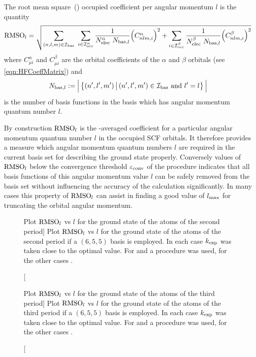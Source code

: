 \defineabbr{RMS}{RMS\xspace}{root mean square}
\begin{defn}
	\label{defn:RMSOl}
	The root mean square~(\RMS) occupied coefficient per angular momentum $l$
	is the quantity
	\begin{equation}
	\text{RMSO}_l =
		\sqrt{
		\sum_{(n,l,m) \in \mathcal{I}_\text{bas}} \
		\sum_{i \in \mathcal{I}_\text{occ}^\alpha} \frac{1}{N_\text{elec}^\alpha \ N_{\text{bas}, l}}
			\Big(C^\alpha_{nlm, i} \Big)^2
			+ \sum_{i \in \mathcal{I}_\text{occ}^\beta} \frac{1}{N_\text{elec}^\beta \ N_{\text{bas}, l}}
			\Big( C^\beta_{nlm, i} \Big)^2
		}
		\label{eqn:DefRMSOl}
	\end{equation}
	where $C^\alpha_{\mu i}$ and $C^\beta_{\mu i}$
	are the orbital coefficients of the $\alpha$ and $\beta$ orbitals
	(see \eqref{eqn:HFCoeffMatrix})
	and
	\[
		N_{\text{bas}, l} := \Big| \left\{ (n',l',m') \, \big|\, (n',l',m') \in \mathcal{I}_\text{bas}
			\ \text{and} \ l' = l \right\} \Big|
	\]
	is the number of basis functions in the \CS basis which has angular momentum
	quantum number $l$.
\end{defn}

By construction $\text{RMSO}_l$ is the \RMS-averaged coefficient for a particular angular
momentum quantum number $l$ in the occupied SCF orbitals.
It therefore provides a measure which angular momentum quantum numbers $l$
are required in the current basis set for describing the ground state properly.
Conversely values of $\text{RMSO}_l$ below the convergence threshold $\varepsilon_\text{conv}$
of the \SCF procedure indicates that all \CS basis functions of this angular momentum
value $l$ can be safely removed from the \CS basis set without
influencing the accuracy of the \HF calculation significantly.
In many cases this property of $\text{RMSO}_l$ can assist in finding a good
value of $l_\text{max}$ for truncating the orbital angular momentum.

\begin{figure}[p]
	\centering
	\caption
	[Plot $\text{RMSO}_l$ vs $l$ for the \HF ground state of the atoms of the second period]
	{
		Plot $\text{RMSO}_l$ vs $l$ for the \HF ground state
		of the atoms of the second period
		if a $(6,5,5)$ \CS basis is employed.
		In each case $k_\text{exp}$ was taken close to the optimal value.
		For  and  a \RHF procedure was used,
		for the other cases \UHF.
	}
	\label{fig:RMSOl_period2}
\end{figure}
\begin{figure}[p]
	\centering
	\caption
	[Plot $\text{RMSO}_l$ vs $l$ for the \HF ground state of the atoms of the third period]
	{
		Plot $\text{RMSO}_l$ vs $l$ for the \HF ground state
		of the atoms of the third period
		if a $(6,5,5)$ \CS basis is employed.
		In each case $k_\text{exp}$ was taken close to the optimal value.
		For  and  a \RHF procedure was used,
		for the other cases \UHF.
	}
	\label{fig:RMSOl_period3}
\end{figure}

